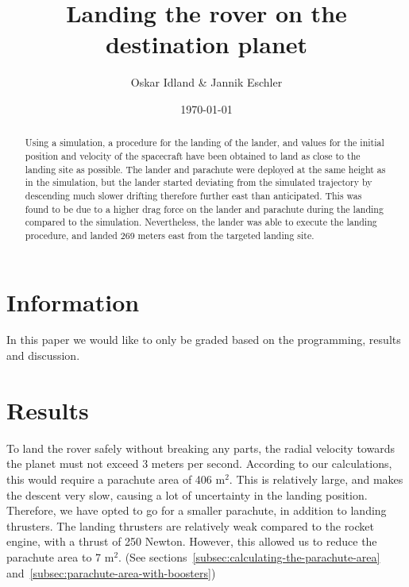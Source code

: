 \documentclass[reprint,english,notitlepage]{revtex4-2}
\begin{document}
\title{Landing the rover on the destination planet}
\author{Oskar Idland \& Jannik Eschler}
\date{\today}

\begin{abstract}
    Using a simulation, a procedure for the landing of the lander, and values for the initial position and velocity of the spacecraft have been obtained to land as close to the landing site as possible.
    The lander and parachute were deployed at the same height as in the simulation, but the lander started deviating from the simulated trajectory by descending much slower drifting therefore further east than anticipated.
    This was found to be due to a higher drag force on the lander and parachute during the landing compared to the simulation.
    Nevertheless, the lander was able to execute the landing procedure, and landed 269 meters east from the targeted landing site.
\end{abstract}

\maketitle

\onecolumngrid
\section{Information} \label{sec:info}
\begin{center}
    In this paper we would like to only be graded based on the programming, results and discussion.
\end{center}
\vspace{20}
\twocolumngrid

\section{Results} \label{sec:results}
    To land the rover safely without breaking any parts, the radial velocity towards the planet must not exceed 3 meters per second.
    According to our calculations, this would require a parachute area of 406 m$^2$.
    This is relatively large, and makes the descent very slow, causing a lot of uncertainty in the landing position.\\
    Therefore, we have opted to go for a smaller parachute, in addition to landing thrusters.
    The landing thrusters are relatively weak compared to the rocket engine, with a thrust of 250 Newton.
    However, this allowed us to reduce the parachute area to 7 m$^2$. (See sections~\ref{subsec:calculating-the-parachute-area} and~\ref{subsec:parachute-area-with-boosters})
\end{document}
